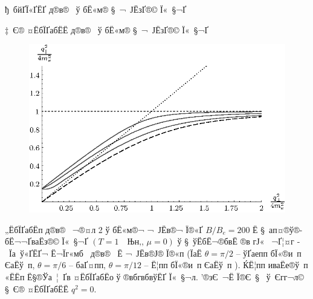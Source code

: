\begin{Slide}{ђ бйҐЇ«Ґ­ЁҐ д®в®­  ў бЁ«м­® § ¬ Ј­ЁзҐ­­®© Ї« §¬Ґ} 


\begin{center}

{\darkgreen ‡ Є®­ ¤ЁбЇҐабЁЁ д®в®­  ў бЁ«м­® § ¬ Ј­ЁзҐ­­®© Ї« §¬Ґ}
\end{center}

\begin{center}
\begin{figure}[htb]
\centerline{\includegraphics*[scale=1.]{fig3.eps}}


\end{figure}

„ЁбЇҐабЁп д®в®­  ¬®¤л 2 ў бЁ«м­®¬ ¬ Ј­Ёв­®¬ Ї®«Ґ $B/B_e = 200$ Ё 
§ ап¤®ў®-бЁ¬¬ҐваЁз­®© 
Ї« §¬Ґ $(T = 1 \quad \mbox{Њн‚},\, \mu = 0)$ 
ў § ўЁбЁ¬®бвЁ ®в гЈ«  ¬Ґ¦¤г ­ Їа ў«Ґ­ЁҐ¬ Ё¬Їг«мб  д®в®­  Ё ¬ Ј­Ёв­®Ј® Ї®«п
(ЇаЁ $\theta = \pi/2$ -- ўҐае­пп бЇ«®и­ п  ЄаЁў п, 
$\theta = \pi/6$ -- баҐ¤­пп, $\theta = \pi/12$ -- ­Ё¦­пп бЇ«®и­ п ЄаЁў п ).
ЌЁ¦­пп иваЁе®ў п «Ё­Ёп Ё§®Ўа ¦ Ґв ¤ЁбЇҐабЁо ў ®вбгвбвўЁҐ Ї« §¬л.
’®зЄ ¬Ё Ї®Є § ­ ў Єгг¬­л© § Є®­ ¤ЁбЇҐабЁЁ $q^2 = 0$.

\end{center}

\end{Slide}


